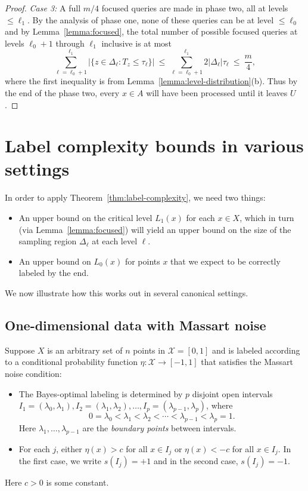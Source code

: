 \documentclass[anon,12pt]{colt2022} %
\def\X{{\mathcal X}}
\begin{document}
\begin{proof}
{\it Case 3:} A full $m/4$ focused queries are made in phase two, all at levels $\leq \ell_1$. By the analysis of phase one, none of these queries can be at level $\leq \ell_0$ and by Lemma~\ref{lemma:focused}, the total number of possible focused queries at levels $\ell_0+1$ through $\ell_1$ inclusive is at most
$$\sum_{\ell=\ell_0+1}^{\ell_1} |\{z \in \Delta_{\ell}: T_z \leq \tau_\ell \}| 
\ \leq \ 
\sum_{\ell=\ell_0+1}^{\ell_1} 2 |\Delta_{\ell}| \tau_\ell
\ \leq \ 
\frac{m}{4} ,
$$
where the first inequality is from Lemma~\ref{lemma:level-distribution}(b). Thus by the end of the phase two, every $x \in A$ will have been processed until it leaves $U$.
\end{proof}

\section{Label complexity bounds in various settings}

In order to apply Theorem~\ref{thm:label-complexity}, we need two things:
\begin{itemize}
\item An upper bound on the critical level $L_1(x)$ for each $x \in X$, which in turn (via Lemma~\ref{lemma:focused}) will yield an upper bound on the size of the sampling region $\Delta_\ell$ at each level $\ell$.
\item An upper bound on $L_0(x)$ for points $x$ that we expect to be correctly labeled by the end.
\end{itemize}
We now illustrate how this works out in several canonical settings.


\subsection{One-dimensional data with Massart noise}

Suppose $X$ is an arbitrary set of $n$ points in $\X = [0,1]$ and is labeled according to a conditional probability function $\eta: \X \to [-1,1]$ that satisfies the Massart noise condition:
\begin{itemize}
\item The Bayes-optimal labeling is determined by $p$ disjoint open intervals $I_1 = (\lambda_0, \lambda_1), I_2 = (\lambda_1, \lambda_2), \ldots, I_p = (\lambda_{p-1}, \lambda_p)$, where
$$ 0 = \lambda_0 < \lambda_1 < \lambda_2 < \cdots < \lambda_{p-1} < \lambda_p = 1 .$$
Here $\lambda_1, \ldots, \lambda_{p-1}$ are the \emph{boundary points} between intervals.
\item For each $j$, either $\eta(x) > c$ for all $x \in I_j$ or $\eta(x) < -c$ for all $x \in I_j$. In the first case, we write $s(I_j) = +1$ and in the second case, $s(I_j) = -1$.
\end{itemize}
Here $c > 0$ is some constant. 
\end{document}
